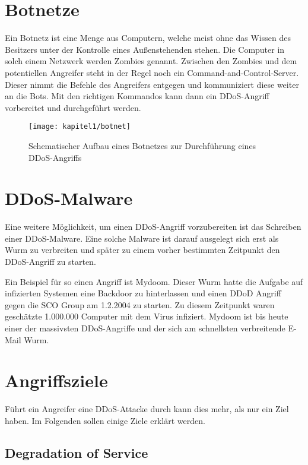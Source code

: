 \section{Botnetze}

Ein Botnetz ist eine Menge aus Computern, welche meist ohne das Wissen des Besitzers unter der Kontrolle eines Außenstehenden stehen. Die Computer in solch einem Netzwerk werden Zombies genannt. Zwischen den Zombies und dem potentiellen Angreifer steht in der Regel noch ein Command-and-Control-Server. Dieser nimmt die Befehle des Angreifers entgegen und kommuniziert diese weiter an die Bots. Mit den richtigen Kommandos kann dann ein DDoS-Angriff vorbereitet und durchgeführt werden.

\begin{figure}[h]
		\centering
		\texttt{[image: kapitel1/botnet]}
		\caption[Schematischer Aufbau bei einem DDoS-Angriff mit einem Botnetz]{Schematischer Aufbau eines Botnetzes zur Durchführung eines DDoS-Angriffs}
		\label{img:botnet}
\end{figure}

\section{DDoS-Malware}

Eine weitere Möglichkeit, um einen DDoS-Angriff vorzubereiten ist das Schreiben einer DDoS-Malware. Eine solche Malware ist darauf ausgelegt sich erst als Wurm zu verbreiten und später zu einem vorher bestimmten Zeitpunkt den DDoS-Angriff zu starten.

Ein Beispiel für so einen Angriff ist Mydoom. Dieser Wurm hatte die Aufgabe auf infizierten Systemen eine Backdoor zu hinterlassen und einen DDoD Angriff gegen die SCO Group am 1.2.2004 zu starten. Zu diesem Zeitpunkt waren geschätzte 1.000.000 Computer mit dem Virus infiziert. Mydoom ist bis heute einer der massivsten DDoS-Angriffe und der sich am schnellsten verbreitende E-Mail Wurm.

\section{Angriffsziele}
\label{chap:kapitel4}

Führt ein Angreifer eine DDoS-Attacke durch kann dies mehr, als nur ein Ziel haben. Im Folgenden sollen einige Ziele erklärt werden.

\subsection{Degradation of Service}

